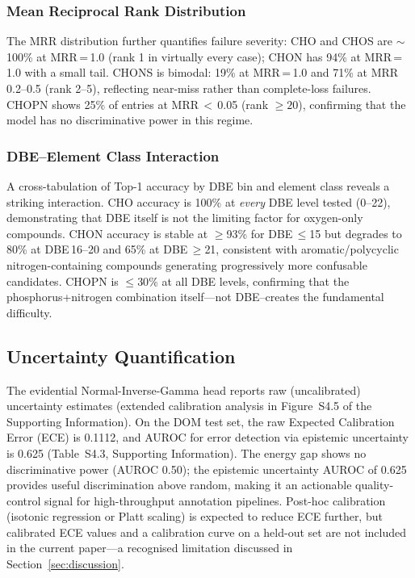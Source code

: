 \documentclass[journal=jcisd8]{achemso}
\begin{document}
\subsubsection{Mean Reciprocal Rank Distribution}

The MRR distribution further quantifies failure severity:
CHO and CHOS are $\sim$100\% at MRR\,=\,1.0 (rank 1 in virtually every case);
CHON has 94\% at MRR\,=\,1.0 with a small tail.  CHONS is bimodal: 19\% at
MRR\,=\,1.0 and 71\% at MRR\,0.2--0.5 (rank 2--5), reflecting near-miss
rather than complete-loss failures.  CHOPN shows 25\% of entries at
MRR\,$<$\,0.05 (rank $\ge20$), confirming that the model has no discriminative power
in this regime.

\subsubsection{DBE--Element Class Interaction}

A cross-tabulation of Top-1 accuracy by DBE bin and element class reveals a striking interaction.  CHO accuracy is 100\%
at \emph{every} DBE level tested (0--22), demonstrating that DBE itself is not the
limiting factor for oxygen-only compounds.  CHON accuracy is stable at $\ge$93\%
for DBE\,$\le$15 but degrades to 80\% at DBE\,16--20 and 65\% at DBE\,$\ge$21,
consistent with aromatic/polycyclic nitrogen-containing compounds generating
progressively more confusable candidates.  CHOPN is $\le30\%$ at all DBE levels,
confirming that the phosphorus+nitrogen combination itself---not DBE--creates the
fundamental difficulty.

\FloatBarrier
\subsection{Uncertainty Quantification}
\label{sec:uq}

The evidential Normal-Inverse-Gamma head reports raw (uncalibrated) uncertainty estimates
(extended calibration analysis in Figure~S4.5 of the Supporting Information).
On the DOM test set, the raw Expected Calibration Error (ECE) is 0.1112, and
AUROC for error detection via epistemic uncertainty is 0.625 (Table~S4.3, Supporting Information).
The energy gap shows no discriminative power (AUROC 0.50); the epistemic uncertainty
AUROC of 0.625 provides useful discrimination above random, making it an actionable
quality-control signal for high-throughput annotation pipelines.
Post-hoc calibration (isotonic regression or Platt scaling) is expected to reduce ECE
further, but calibrated ECE values and a calibration curve on a held-out set are not
included in the current paper---a recognised limitation discussed in Section~\ref{sec:discussion}.
\end{document}
